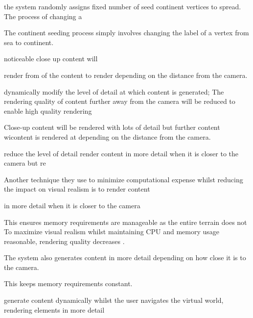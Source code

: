 the system randomly assigns fixed number of seed continent vertices to spread. The process of changing a 

The continent seeding process simply involves changing the label of a vertex from sea to continent.

  noticeable close up content will 

render from of the content to render  depending on the distance from the camera. 

 dynamically modify the level of detail at which content is generated; The rendering quality of content further away from the camera will be reduced to enable high quality rendering 

 Close-up content will be rendered with lots of detail but further content wicontent is rendered at depending on the distance from the camera. 

reduce the level of detail  render content in more detail when it is closer to the camera but re

Another technique they use to minimize computational expense whilst reducing the impact on visual realism is to render content 

in more detail when it is closer to the camera 

This ensures memory requirements are manageable as the entire terrain does not To maximize visual realism whilst maintaining CPU and memory usage reasonable, rendering quality decreases . 

 The system also generates content in more detail depending on how close it is to the camera.

 This keeps memory requirements constant.

 generate content dynamically whilst the user navigates the virtual world, rendering elements in more detail 
